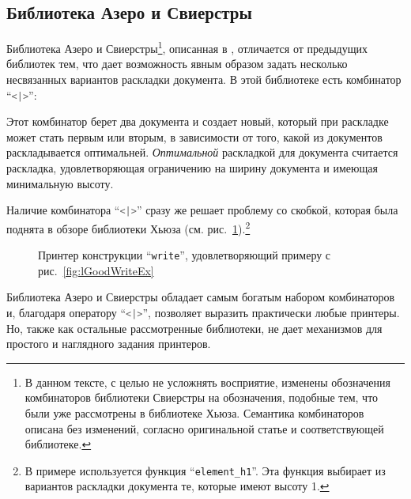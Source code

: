 \newpage

\subsection{Библиотека Азеро и Свиерстры}

Библиотека Азеро и Свиерстры\footnote{
В данном тексте, с целью не усложнять восприятие, изменены обозначения комбинаторов библиотеки Свиерстры на обозначения, подобные тем, что были уже рассмотрены в библиотеке Хьюза. Семантика комбинаторов описана без изменений, согласно оригинальной статье и соответствующей библиотеке.
}, описанная в \cite{swierstra}, отличается от предыдущих библиотек тем, что дает возможность явным образом задать несколько несвязанных вариантов раскладки документа. В этой библиотеке есть комбинатор “\lstinline[language=Haskell]{<|>}”:



Этот комбинатор берет два документа и создает новый, который при раскладке может стать первым или вторым, в зависимости от того, какой из документов раскладывается оптимальней. \textit{Оптимальной} раскладкой для документа считается раскладка, удовлетворяющая ограничению на ширину документа и имеющая минимальную высоту.

Наличие комбинатора “\lstinline[language=Haskell]{<|>}” сразу же решает проблему со скобкой, которая была поднята в обзоре библиотеки Хьюза (см. рис.~\ref{fig:bracketSwierstra}).\footnote{
	В примере используется функция “\lstinline[language=Haskell]{element_h1}”. Эта функция выбирает из вариантов раскладки документа те, которые имеют высоту 1.
}

\begin{figure}[h!]
	
	\caption{Принтер конструкции “\lstinline{write}”, удовлетворяющий примеру с рис.~\ref{fig:lGoodWriteEx}}
	\label{fig:bracketSwierstra}
\end{figure}


Библиотека Азеро и Свиерстры обладает самым богатым набором комбинаторов и, благодаря оператору “\lstinline[language=Haskell]{<|>}”, позволяет выразить практически любые принтеры. Но, также как остальные рассмотренные библиотеки, не дает механизмов для простого и наглядного задания принтеров.